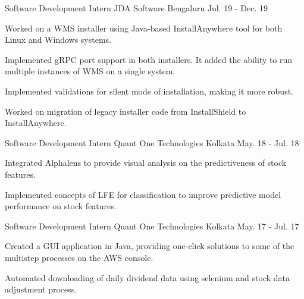 

\begin{cventries}

  \cventry
    {Software Development Intern} %
    {JDA Software} %
    {Bengaluru} %
    {Jul. 19 - Dec. 19} %
    {
      \begin{cvitems}
        \item{Worked on a WMS installer using Java-based InstallAnywhere tool for both Linux
         and Windows systems.}
        \item{Implemented gRPC port support in both installers.
         It added the ability to run multiple instances of WMS on a single system.}
        \item{Implemented validations for silent mode of installation, making it more robust.}
        \item{Worked on migration of legacy installer code from InstallShield to InstallAnywhere.}
      \end{cvitems}
    }

  \cventry
    {Software Development Intern} %
    {Quant One Technologies} %
    {Kolkata} %
    {May. 18 - Jul. 18} %
    {
      \begin{cvitems}
        \item {Integrated Alphalens to provide visual analysis on the predictiveness
         of stock features.}
        \item {Implemented concepts of LFE for classification to improve predictive
         model performance on stock features.}
      \end{cvitems}
    }

  \cventry
    {Software Development Intern} %
    {Quant One Technologies} %
    {Kolkata} %
    {May. 17 - Jul. 17} %
    {
      \begin{cvitems}
        \item {Created a GUI application in Java, providing one-click
         solutions to some of the multistep processes on the AWS console.}
        \item {Automated downloading of daily dividend data using selenium
         and stock data adjustment process.}
      \end{cvitems}
    }

\end{cventries}
